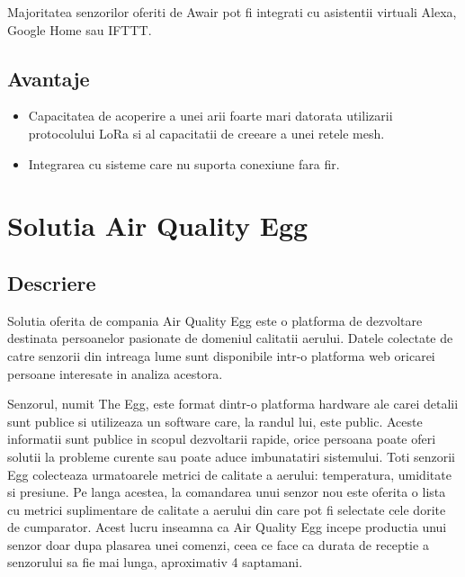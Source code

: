Majoritatea senzorilor oferiti de Awair pot fi integrati cu asistentii virtuali Alexa, Google Home sau IFTTT.

\subsection{Avantaje}\label{subsec:awair_avantaje}
\begin{itemize}
	\item Capacitatea de acoperire a unei arii foarte mari datorata utilizarii protocolului LoRa si al capacitatii de creeare a unei retele mesh.
	\item Integrarea cu sisteme care nu suporta conexiune fara fir.
\end{itemize}

\section{Solutia Air Quality Egg}\label{sec:airqualityegg}
\subsection{Descriere}\label{subsec:airqualityegg_descriere}
Solutia oferita de compania Air Quality Egg este o platforma de dezvoltare destinata persoanelor pasionate de domeniul calitatii aerului. Datele colectate de catre 
senzorii din intreaga lume sunt disponibile intr-o platforma web oricarei persoane interesate in analiza acestora.

Senzorul, numit The Egg, este format dintr-o platforma hardware ale carei detalii sunt publice si utilizeaza un software care, la randul lui, este public. Aceste 
informatii sunt publice in scopul dezvoltarii rapide, orice persoana poate oferi solutii la probleme curente sau poate aduce imbunatatiri sistemului. Toti senzorii 
Egg colecteaza urmatoarele metrici de calitate a aerului: temperatura, umiditate si presiune. Pe langa acestea, la comandarea unui senzor nou este oferita o 
lista cu metrici suplimentare de calitate a aerului din care pot fi selectate cele dorite de cumparator. Acest lucru inseamna ca Air Quality Egg incepe productia 
unui senzor doar dupa plasarea unei comenzi, ceea ce face ca durata de receptie a senzorului sa fie mai lunga, aproximativ 4 saptamani.

